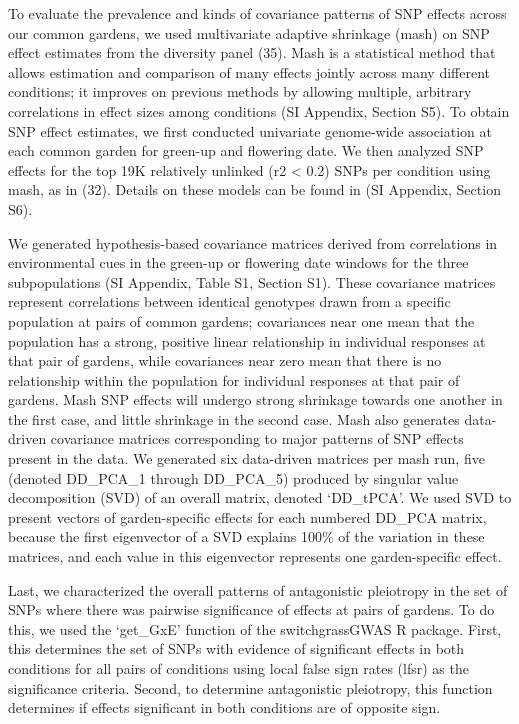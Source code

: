 \documentclass[
  9pt,
  twocolumn,
  twoside]{pnas-new}
\begin{document}
To evaluate the prevalence and kinds of covariance patterns of SNP
effects across our common gardens, we used multivariate adaptive
shrinkage (mash) on SNP effect estimates from the diversity panel (35).
Mash is a statistical method that allows estimation and comparison of
many effects jointly across many different conditions; it improves on
previous methods by allowing multiple, arbitrary correlations in effect
sizes among conditions (SI Appendix, Section S5). To obtain SNP effect
estimates, we first conducted univariate genome-wide association at each
common garden for green-up and flowering date. We then analyzed SNP
effects for the top 19K relatively unlinked (r2 \textless{} 0.2) SNPs
per condition using mash, as in (32). Details on these models can be
found in (SI Appendix, Section S6).

We generated hypothesis-based covariance matrices derived from
correlations in environmental cues in the green-up or flowering date
windows for the three subpopulations (SI Appendix, Table S1, Section
S1). These covariance matrices represent correlations between identical
genotypes drawn from a specific population at pairs of common gardens;
covariances near one mean that the population has a strong, positive
linear relationship in individual responses at that pair of gardens,
while covariances near zero mean that there is no relationship within
the population for individual responses at that pair of gardens. Mash
SNP effects will undergo strong shrinkage towards one another in the
first case, and little shrinkage in the second case. Mash also generates
data-driven covariance matrices corresponding to major patterns of SNP
effects present in the data. We generated six data-driven matrices per
mash run, five (denoted DD\_PCA\_1 through DD\_PCA\_5) produced by
singular value decomposition (SVD) of an overall matrix, denoted
`DD\_tPCA'. We used SVD to present vectors of garden-specific effects
for each numbered DD\_PCA matrix, because the first eigenvector of a SVD
explains 100\% of the variation in these matrices, and each value in
this eigenvector represents one garden-specific effect.

Last, we characterized the overall patterns of antagonistic pleiotropy
in the set of SNPs where there was pairwise significance of effects at
pairs of gardens. To do this, we used the `get\_GxE' function of the
switchgrassGWAS R package. First, this determines the set of SNPs with
evidence of significant effects in both conditions for all pairs of
conditions using local false sign rates (lfsr) as the significance
criteria. Second, to determine antagonistic pleiotropy, this function
determines if effects significant in both conditions are of opposite
sign.
\end{document}
